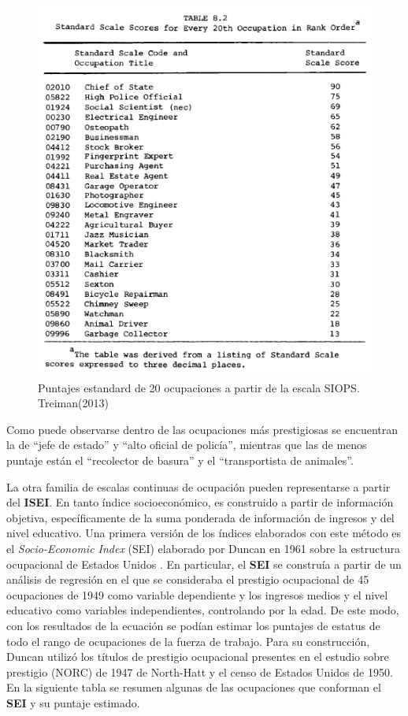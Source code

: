 \documentclass[
]{book}
\begin{document}
\begin{figure}

{\centering \includegraphics[width=0.8\linewidth]{imagenes/treiman} 

}

\caption{Puntajes estandard de 20 ocupaciones a partir de la escala SIOPS. Treiman(2013)}\label{fig:unnamed-chunk-62}
\end{figure}

Como puede observarse dentro de las ocupaciones más prestigiosas se encuentran la de ``jefe de estado'' y ``alto oficial de policía'', mientras que las de menos puntaje están el ``recolector de basura'' y el ``transportista de animales''.

La otra familia de escalas continuas de ocupación pueden representarse a partir del \textbf{ISEI}. En tanto índice socioeconómico, es construido a partir de información objetiva, específicamente de la suma ponderada de información de ingresos y del nivel educativo. Una primera versión de los índices elaborados con este método es el \emph{Socio-Economic Index} (SEI) elaborado por Duncan en 1961 sobre la estructura ocupacional de Estados Unidos \citep{Blau.Duncan1967, Duncan.Hodge1963}. En particular, el \textbf{SEI} se construía a partir de un análisis de regresión en el que se consideraba el prestigio ocupacional de 45 ocupaciones de 1949 como variable dependiente y los ingresos medios y el nivel educativo como variables independientes, controlando por la edad. De este modo, con los resultados de la ecuación se podían estimar los puntajes de estatus de todo el rango de ocupaciones de la fuerza de trabajo. Para su construcción, Duncan utilizó los títulos de prestigio ocupacional presentes en el estudio sobre prestigio (NORC) de 1947 de North-Hatt y el censo de Estados Unidos de 1950. En la siguiente tabla se resumen algunas de las ocupaciones que conforman el \textbf{SEI} y su puntaje estimado.
\end{document}
